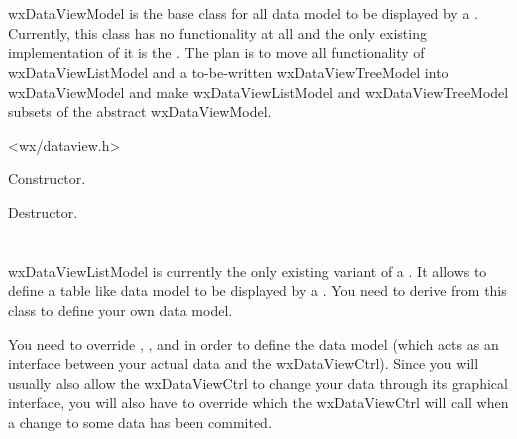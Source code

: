 
\section{}\label{wxdataviewmodel}

wxDataViewModel is the base class for all data model to be
displayed by a . 
Currently, this class has no functionality at all and the
only existing implementation of it is the 
. The
plan is to move all functionality of wxDataViewListModel
and a to-be-written wxDataViewTreeModel into wxDataViewModel
and make wxDataViewListModel and wxDataViewTreeModel subsets
of the abstract wxDataViewModel.




<wx/dataview.h>

\label{wxdataviewmodelwxdataviewmodel}


Constructor.

\label{wxdataviewmodeldtor}


Destructor.

\section{}\label{wxdataviewlistmodel}

wxDataViewListModel is currently the only existing variant
of a . It allows
to define a table like data model to be displayed by a
. You need to derive
from this class to define your own data model.

You need to override ,
,
 and
 in order to
define the data model (which acts as an interface between 
your actual data and the wxDataViewCtrl). Since you will
usually also allow the wxDataViewCtrl to change your data
through its graphical interface, you will also have to override
 which the
wxDataViewCtrl will call when a change to some data has been
commited.

